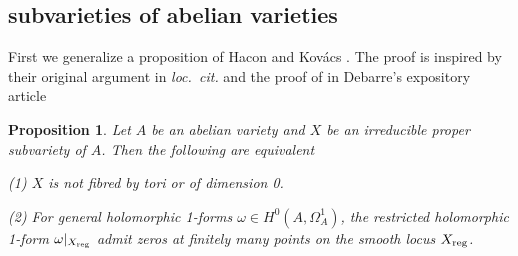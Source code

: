 \documentclass[a4paper,12pt,reqno]{amsart}
\theoremstyle{plain}
\newtheorem{proposition}[theorem]{Proposition}
\theoremstyle{remark}
\begin{document}
\subsection{subvarieties of abelian varieties}

First we generalize a proposition of Hacon and Kov\'acs \cite[Proposition 3.1]{HK05}. The proof is inspired
by their original argument in \textit{loc.\ cit.} and the proof of \cite[Lemma 3.1]{Deb} in Debarre's expository article

\begin{proposition}\label{van-nonsimple}
Let $A$ be an abelian variety and $X$ be an irreducible proper subvariety of $A$. Then the following are equivalent

(1) $X$ is not fibred by tori or of dimension 0. 

(2) For general holomorphic 1-forms $\omega\in H^0(A, \Omega_A^1)$, the restricted holomorphic 1-form $\omega|_{X_{\textnormal{reg}}}$ admit zeros at finitely many points on the smooth locus $X_{\textnormal{reg}}$.
\end{proposition}
\end{document}
